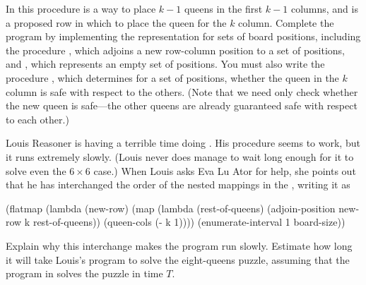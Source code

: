 \begin{exercise}
	In this procedure  is a way to place \( k - 1 \) queens in the first \( k - 1 \) columns, and  is a proposed row in which to place the queen for the \( k \) column.
	Complete the program by implementing the representation for sets of board positions, including the procedure , which adjoins a new row-column position to a set of positions, and , which represents an empty set of positions.
	You must also write the procedure , which determines for a set of positions, whether the queen in the \( k \) column is safe with respect to the others.
	(Note that we need only check whether the new queen is safe---the other queens are already guaranteed safe with respect to each other.)
\end{exercise}



\begin{exercise}
	\label{Exercise 2.43}
	Louis Reasoner is having a terrible time doing .
	His  procedure seems to work, but it runs extremely slowly.
	(Louis never does manage to wait long enough for it to solve even the \( 6 × 6 \) case.)
	When Louis asks Eva Lu Ator for help, she points out that he has interchanged the order of the nested mappings in the , writing it as
	\begin{scheme}
	  (flatmap
	   (lambda (new-row)
	     (map (lambda (rest-of-queens)
	            (adjoin-position new-row
	                             k
	                             rest-of-queens))
	          (queen-cols (- k 1))))
	   (enumerate-interval 1 board-size))
	\end{scheme}
	Explain why this interchange makes the program run slowly.
	Estimate how long it will take Louis’s program to solve the eight-queens puzzle, assuming that the program in  solves the puzzle in time \( T \).
\end{exercise}
